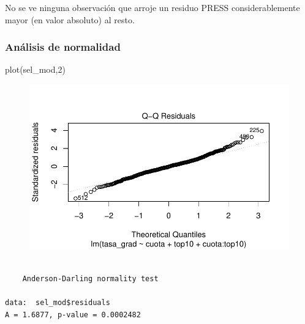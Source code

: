 \documentclass[
  letterpaper,
  DIV=11,
  numbers=noendperiod]{scrartcl}
\newenvironment{Shaded}{\begin{snugshade}}{\end{snugshade}}
\newcommand{\DecValTok}[1]{\textcolor[rgb]{0.68,0.00,0.00}{#1}}
\newcommand{\FunctionTok}[1]{\textcolor[rgb]{0.28,0.35,0.67}{#1}}
\newcommand{\NormalTok}[1]{\textcolor[rgb]{0.00,0.23,0.31}{#1}}
\newcommand{\SpecialCharTok}[1]{\textcolor[rgb]{0.37,0.37,0.37}{#1}}
\begin{document}
No se ve ninguna observación que arroje un residuo PRESS
considerablemente mayor (en valor absoluto) al resto.

\hypertarget{anuxe1lisis-de-normalidad}{%
\subsubsection{Análisis de normalidad}\label{anuxe1lisis-de-normalidad}}

\begin{Shaded}
\begin{Highlighting}[]
\FunctionTok{plot}\NormalTok{(sel\_mod,}\DecValTok{2}\NormalTok{)}
\end{Highlighting}
\end{Shaded}

\begin{figure}[H]

{\centering \includegraphics{TP_final_files/figure-pdf/unnamed-chunk-33-1.pdf}

}

\end{figure}

\begin{Shaded}
\end{Shaded}

\begin{verbatim}

    Anderson-Darling normality test

data:  sel_mod$residuals
A = 1.6877, p-value = 0.0002482
\end{verbatim}
\end{document}
